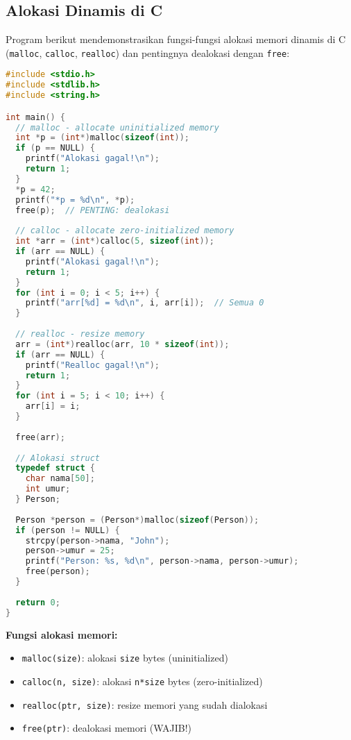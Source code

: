 \documentclass[../main.tex]{subfiles}
\begin{document}
\subsection{Alokasi Dinamis di C}

Program berikut mendemonstrasikan fungsi-fungsi alokasi memori dinamis di C (\texttt{malloc}, \texttt{calloc}, \texttt{realloc}) dan pentingnya dealokasi dengan \texttt{free}:

\begin{lstlisting}[language=C, caption={malloc, calloc, realloc, free di C}]
#include <stdio.h>
#include <stdlib.h>
#include <string.h>

int main() {
  // malloc - allocate uninitialized memory
  int *p = (int*)malloc(sizeof(int));
  if (p == NULL) {
    printf("Alokasi gagal!\n");
    return 1;
  }
  *p = 42;
  printf("*p = %d\n", *p);
  free(p);  // PENTING: dealokasi
  
  // calloc - allocate zero-initialized memory
  int *arr = (int*)calloc(5, sizeof(int));
  if (arr == NULL) {
    printf("Alokasi gagal!\n");
    return 1;
  }
  for (int i = 0; i < 5; i++) {
    printf("arr[%d] = %d\n", i, arr[i]);  // Semua 0
  }
  
  // realloc - resize memory
  arr = (int*)realloc(arr, 10 * sizeof(int));
  if (arr == NULL) {
    printf("Realloc gagal!\n");
    return 1;
  }
  for (int i = 5; i < 10; i++) {
    arr[i] = i;
  }
  
  free(arr);
  
  // Alokasi struct
  typedef struct {
    char nama[50];
    int umur;
  } Person;
  
  Person *person = (Person*)malloc(sizeof(Person));
  if (person != NULL) {
    strcpy(person->nama, "John");
    person->umur = 25;
    printf("Person: %s, %d\n", person->nama, person->umur);
    free(person);
  }
  
  return 0;
}
\end{lstlisting}

\textbf{Fungsi alokasi memori:}
\begin{itemize}
  \item \texttt{malloc(size)}: alokasi \texttt{size} bytes (uninitialized)
  \item \texttt{calloc(n, size)}: alokasi \texttt{n*size} bytes (zero-initialized)
  \item \texttt{realloc(ptr, size)}: resize memori yang sudah dialokasi
  \item \texttt{free(ptr)}: dealokasi memori (WAJIB!)
\end{itemize}
\end{document}
